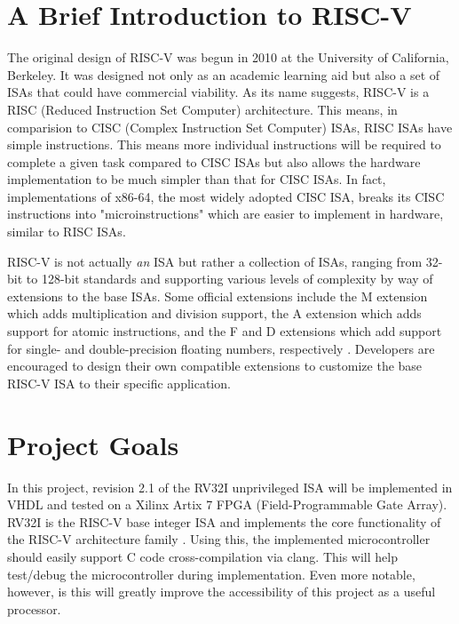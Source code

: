 \documentclass[lettersize,journal]{IEEEtran}
\begin{document}
\section{A Brief Introduction to RISC-V}
The original design of RISC-V was begun in 2010 at the University of California, Berkeley. 
It was designed not only as an academic learning aid but also a set of ISAs that could have commercial viability. 
As its name suggests, RISC-V is a RISC (Reduced Instruction Set Computer) architecture. 
This means, in comparision to CISC (Complex Instruction Set Computer) ISAs, RISC ISAs have simple instructions. 
This means more individual instructions will be required to complete a given task compared to CISC ISAs but also allows the 
hardware implementation to be much simpler than that for CISC ISAs. In fact, implementations of x86-64, the most widely adopted CISC ISA, 
breaks its CISC instructions into "microinstructions" which are easier to implement in hardware, similar to RISC ISAs.

RISC-V is not actually \textit{an} ISA but rather a collection of ISAs, 
ranging from 32-bit to 128-bit standards and supporting various levels of complexity by way of extensions to the base ISAs. 
Some official extensions include the M extension which adds multiplication and division support, 
the A extension which adds support for atomic instructions, and the F and D extensions which add support for single- and double-precision floating numbers, 
respectively \cite{riscvunprovisioned}. Developers are encouraged to design their own compatible extensions to customize the base RISC-V ISA to their specific application. 

\section{Project Goals}
In this project, revision 2.1 of the RV32I unprivileged ISA will be implemented in VHDL and tested on a Xilinx Artix 7 FPGA (Field-Programmable Gate Array). 
RV32I is the RISC-V base integer ISA and implements the core functionality of the RISC-V architecture family \cite{riscvunprovisioned}.
Using this, the implemented microcontroller should easily support C code cross-compilation via clang.
This will help test/debug the microcontroller during implementation.
Even more notable, however, is this will greatly improve the accessibility of this project as a useful processor.
\end{document}
